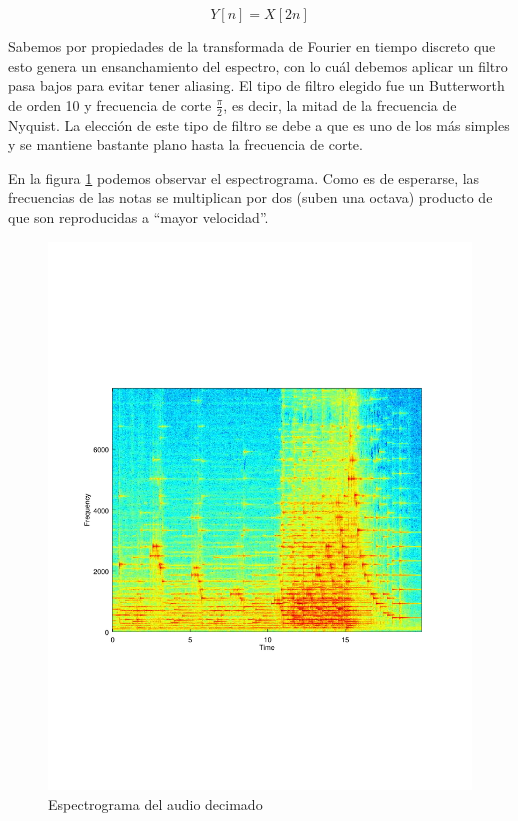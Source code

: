 \documentclass[paper=a4, fontsize=11pt]{scrartcl} %
\numberwithin{equation}{section} %
\numberwithin{figure}{section} %
\numberwithin{table}{section} %
\begin{document}
\begin{equation}
    Y[n] = X[2n]
\end{equation}

Sabemos por propiedades de la transformada de Fourier en tiempo discreto que esto genera un ensanchamiento del espectro, con lo cuál debemos aplicar un filtro pasa bajos para evitar tener aliasing. El tipo de filtro elegido fue un Butterworth de orden 10 y frecuencia de corte $\frac{\pi}{2}$, es decir, la mitad de la frecuencia de Nyquist. La elección de este tipo de filtro se debe a que es uno de los más simples y se mantiene bastante plano hasta la frecuencia de corte.

En la figura \ref{audio_decimado} podemos observar el espectrograma. Como es de esperarse, las frecuencias de las notas se multiplican por dos (suben una octava) producto de que son reproducidas a ``mayor velocidad''.


\begin{figure}[t]
\includegraphics[width=\textwidth]{../images/specgram_4_decimated.pdf}
\caption{Espectrograma del audio decimado}
\label{audio_decimado}
\end{figure}
\end{document}

